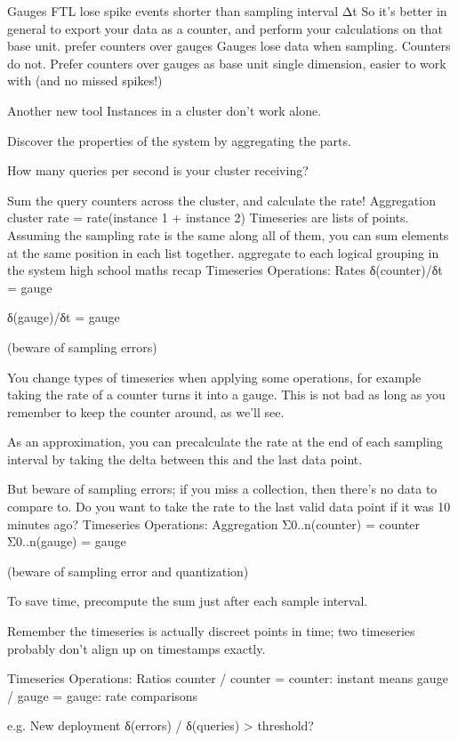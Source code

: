 \documentclass[online,helvetica]{chaksem}
\begin{document}
Gauges FTL
lose spike events shorter than sampling interval
Δt
So it's better in general to export your data as a counter, and perform your calculations on that base unit.
prefer counters over gauges
Gauges lose data when sampling.
Counters do not.
Prefer counters over gauges as base unit single dimension, easier to work with (and no missed spikes!)

Another new tool
Instances in a cluster don't work alone.

Discover the properties of the system by aggregating the parts.

How many queries per second is your cluster receiving?

Sum the query counters across the cluster, and calculate the rate!
Aggregation
cluster rate = rate(instance 1 + instance 2)
Timeseries are lists of points.  Assuming the sampling rate is the same along all of them, you can sum elements at the same position in each list together.  
aggregate to each logical grouping in the system
high school maths recap
Timeseries Operations: Rates
δ(counter)/δt = gauge

δ(gauge)/δt = gauge

(beware of sampling errors)

You change types of timeseries when applying some operations, for example taking the rate of a counter turns it into a gauge.  This is not bad as long as you remember to keep the counter around, as we'll see.

As an approximation, you can precalculate the rate at the end of each sampling interval by taking the delta between this and the last data point.

But beware of sampling errors; if you miss a collection, then there's no data to compare to.  Do you want to take the rate to the last valid data point if it was 10 minutes ago?
Timeseries Operations: Aggregation
Σ0..n(counter) = counter
Σ0..n(gauge) = gauge


(beware of sampling error and quantization)

To save time, precompute the sum just after each sample interval.

Remember the timeseries is actually discreet points in time; two timeseries probably don't align up on timestamps exactly.

Timeseries Operations: Ratios
counter / counter = counter: instant means
gauge / gauge = gauge: rate comparisons

e.g. New deployment
δ(errors) / δ(queries) > threshold?
\end{document}
